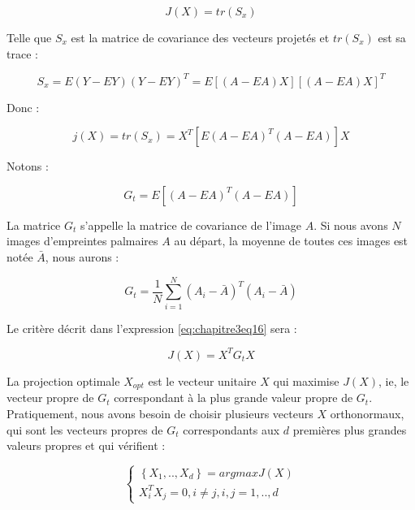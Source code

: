 \begin{center}
	\begin{equation}\label{eq:chapitre3eq16}
	J(X)=tr(S_x)
	\end{equation}
\end{center}
Telle que $S_x $ est la matrice de covariance des vecteurs projetés et $tr(S_x)$ est sa trace :
\begin{center}
	\begin{equation}\label{eq:chapitre3eq17}
	S_x=E(Y-EY)(Y-EY)^T=E[(A-EA)X][(A-EA)X]^T
	\end{equation}
\end{center}
Donc :
\begin{center}
	\begin{equation}\label{eq:chapitre3eq18}
	j(X)=tr(S_x)=X^T [E(A-EA)^T (A-EA)]X
	\end{equation}
\end{center}
Notons :
\begin{center}
	\begin{equation}\label{eq:chapitre3eq19}
	G_t=E[(A-EA)^T (A-EA)]
	\end{equation}
\end{center}
La matrice $G_t$ s’appelle la matrice de covariance de l’image $A$.
Si nous avons $N$ images d’empreintes palmaires $A$ au départ, la moyenne de toutes ces images est notée $\bar{A}$, nous aurons :
\begin{center}
	\begin{equation}\label{eq:chapitre3eq20}
	G_t=\frac{1}{N}\sum_{i=1}^{N}(A_i-\bar{A})^T(A_i-\bar{A})
	\end{equation}
\end{center}
Le critère décrit dans l’expression \ref{eq:chapitre3eq16} sera :
\begin{center}
	\begin{equation}\label{eq:chapitre3eq21}
	J(X)=X^T G_t X  
	\end{equation}
\end{center}
La projection optimale $X_{opt}$ est le vecteur unitaire $X$ qui maximise $J(X)$, ie, le vecteur propre de $G_t$ correspondant à la plus grande valeur propre de $G_t$. Pratiquement, nous avons besoin de choisir plusieurs vecteurs $X$ orthonormaux, qui sont les vecteurs propres de $G_t$ correspondants aux $d$ premières plus grandes valeurs propres et qui vérifient :
\begin{center}
	
	\begin{equation}\label{eq:chapitre3eq22}
	\begin{cases}\left\{X_{1},..,X_{d}\right\}=argmaxJ(X)
	\\ X_i^TX_j=0,i\neq j , i,j=1,..,d\end{cases}
	\end{equation}
\end{center}
